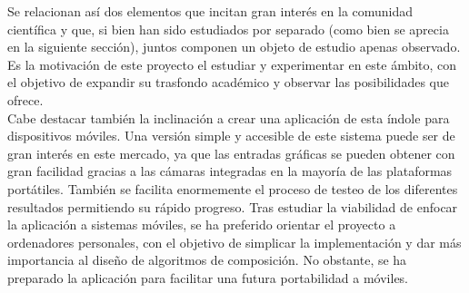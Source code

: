 Se relacionan así dos elementos que incitan gran interés en la comunidad científica y que, si bien han sido estudiados por separado (como bien se aprecia en la siguiente sección), juntos componen un objeto de estudio apenas observado. Es la motivación de este proyecto el estudiar y experimentar en este ámbito, con el objetivo de expandir su trasfondo académico y observar las posibilidades que ofrece.\\

Cabe destacar también la inclinación a crear una aplicación de esta índole para dispositivos móviles. Una versión simple y accesible de este sistema puede ser de gran interés en este mercado, ya que las entradas gráficas se pueden obtener con gran facilidad gracias a las cámaras integradas en la mayoría de las plataformas portátiles. También se facilita enormemente el proceso de testeo de los diferentes resultados permitiendo su rápido progreso. Tras estudiar la viabilidad de enfocar la aplicación a sistemas móviles, se ha preferido orientar el proyecto a ordenadores personales, con el objetivo de simplicar la implementación y dar más importancia al diseño de algoritmos de composición. No obstante, se ha preparado la aplicación para facilitar una futura portabilidad a móviles.\\